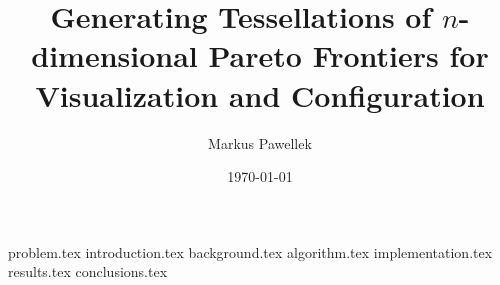 \documentclass[fleqn,10pt,twoside,twocolumn]{stdglobal}
\title{Generating Tessellations of $n$-dimensional Pareto Frontiers for Visualization and Configuration}
\author{Markus Pawellek}
\date{\today}
\let\oldpagenumbering\pagenumbering
\renewcommand*\pagenumbering[1]{\oldpagenumbering{#1}}
\begin{document}


  {problem.tex}
  {introduction.tex}
  {background.tex}
  {algorithm.tex}
  {implementation.tex}
  {results.tex}
  {conclusions.tex}

  \printbibliography[heading=bibintoc]
\end{document}
